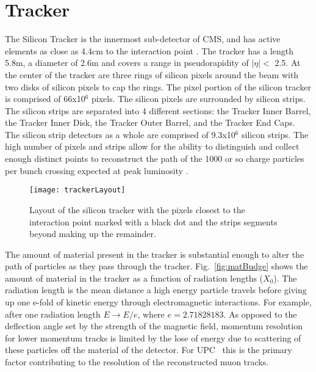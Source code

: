   \section{Tracker}
    The Silicon Tracker is the innermost sub-detector of CMS, and has active
    	elements as close as 4.4cm to the interaction point \cite{tCmsE}. 
    The tracker has a length 5.8m, a diameter of 2.6m and
    	covers a range in pseudorapidity of \(|\eta| <\) 2.5.
    At the center of the tracker are three rings of silicon pixels around the beam 
    	with two disks of silicon pixels to cap the rings.
    The pixel portion of the silicon tracker is comprised of 66x10$^{6}$
    	pixels.
    The silicon pixels are surrounded by silicon strips.
    The silicon strips are separated into 4 different sections: 
    	the Tracker Inner Barrel, the Tracker Inner Disk, the Tracker Outer 
    	Barrel, and the Tracker End Caps.
    The silicon strip detectors as a whole are comprised of 9.3x10$^{6}$ silicon 
    	strips.
    The high number of pixels and strips allow for the ability to distinguish
    	and collect enough distinct points to reconstruct the path of the 1000
    	or so charge particles per bunch crossing expected at peak luminosity
    	\cite{tCmsE}.

    \begin{figure}[!Hhbt]
      \centering
      \texttt{[image: trackerLayout]}
      \caption{Layout of the silicon tracker with the pixels closest to the 
        interaction point marked with a black dot and the strips segments 
        beyond making up the remainder.}
      \label{fig:fig:trackerLayout}
    \end{figure}

    The amount of material present in the tracker is substantial enough to
      alter the path of particles as they pass through the tracker. 
    Fig.~\ref{fig:matBudge} shows the amount of material in the tracker 
      as a function of radiation lengths ($X_{0}$).
    The radiation length is the mean distance a high energy particle travels 
      before giving up one e-fold of kinetic energy through electromagnetic
    	interactions.
    For example, after one radiation length $E \rightarrow E/e$, where 
    	$e = 2.71828183$. 
    As opposed to the deflection angle set by the strength of the magnetic 
      field, momentum resolution for lower momentum tracks is limited by the 
      lose of energy due to scattering of these particles off the material of 
      the detector.
    For UPC \JPsi~this is the primary factor contributing to the resolution of
      the reconstructed muon tracks. 
  
